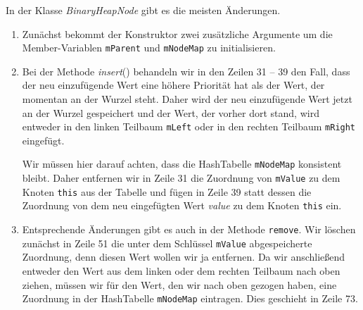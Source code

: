 In der Klasse \textsl{BinaryHeapNode} gibt es die meisten \"Anderungen.
\begin{enumerate}
\item Zun\"achst bekommt der Konstruktor zwei zus\"atzliche Argumente um die 
      Member-Variablen \texttt{mParent} und \texttt{mNodeMap} zu initialisieren. 
\item Bei der Methode \textsl{insert}() behandeln wir in den Zeilen 31 -- 39 
      den Fall, dass der neu einzuf\"ugende Wert eine h\"ohere Priorit\"at hat als der Wert, der
      momentan an der Wurzel steht.  Daher wird der neu einzuf\"ugende Wert
      jetzt an der Wurzel gespeichert und der Wert, der vorher dort stand,
      wird entweder in den linken Teilbaum \texttt{mLeft} oder in den
      rechten Teilbaum \texttt{mRight} eingef\"ugt.

      Wir m\"ussen hier darauf achten, dass die HashTabelle \texttt{mNodeMap} konsistent
      bleibt.  Daher entfernen wir in Zeile 31 die Zuordnung von \texttt{mValue} zu dem
      Knoten \texttt{this} aus der Tabelle und f\"ugen in Zeile 39 statt dessen 
      die Zuordnung von dem neu eingef\"ugten Wert \textsl{value} zu dem Knoten
      \texttt{this} ein.
\item Entsprechende \"Anderungen gibt es auch in der Methode \texttt{remove}.
      Wir l\"oschen zun\"achst in Zeile 51 die unter dem Schl\"ussel \texttt{mValue}
      abgespeicherte Zuordnung, denn diesen Wert wollen wir ja entfernen.
      Da wir anschlie{\ss}end entweder den Wert aus dem linken oder dem rechten Teilbaum 
      nach oben ziehen, m\"ussen wir f\"ur den Wert, den wir nach oben gezogen haben,
      eine Zuordnung in der HashTabelle \texttt{mNodeMap} eintragen. Dies geschieht
      in Zeile 73.


\end{enumerate}
